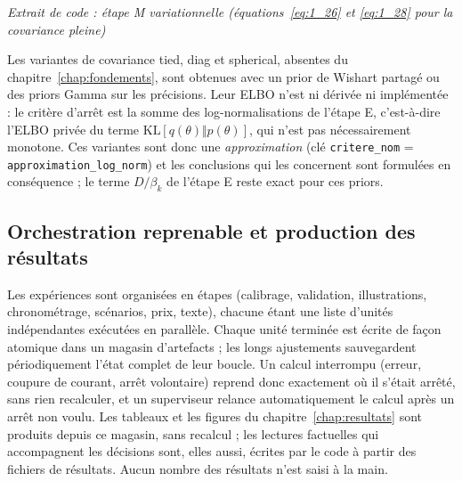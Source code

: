 \begin{center}\small\emph{Extrait de code : étape M variationnelle (équations~\ref{eq:1_26} et \ref{eq:1_28} pour la covariance pleine)}\end{center}

Les variantes de covariance tied, diag et spherical, absentes du chapitre~\ref{chap:fondements}, sont obtenues avec un prior de Wishart partagé ou des priors Gamma sur les précisions. Leur ELBO n'est ni dérivée ni implémentée : le critère d'arrêt est la somme des log-normalisations de l'étape E, c'est-à-dire l'ELBO privée du terme $\mathrm{KL}[q(\theta)\Vert p(\theta)]$, qui n'est pas nécessairement monotone. Ces variantes sont donc une \emph{approximation} (clé \texttt{critere\_nom} = \texttt{approximation\_log\_norm}) et les conclusions qui les concernent sont formulées en conséquence ; le terme $D/\beta_k$ de l'étape E reste exact pour ces priors.

\subsection{Orchestration reprenable et production des résultats}\label{sec:architecture}
Les expériences sont organisées en étapes (calibrage, validation, illustrations, chronométrage, scénarios, prix, texte), chacune étant une liste d'unités indépendantes exécutées en parallèle. Chaque unité terminée est écrite de façon atomique dans un magasin d'artefacts ; les longs ajustements sauvegardent périodiquement l'état complet de leur boucle. Un calcul interrompu (erreur, coupure de courant, arrêt volontaire) reprend donc exactement où il s'était arrêté, sans rien recalculer, et un superviseur relance automatiquement le calcul après un arrêt non voulu. Les tableaux et les figures du chapitre~\ref{chap:resultats} sont produits depuis ce magasin, sans recalcul ; les lectures factuelles qui accompagnent les décisions sont, elles aussi, écrites par le code à partir des fichiers de résultats. Aucun nombre des résultats n'est saisi à la main.

